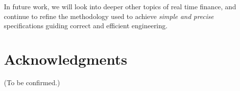 In future work, we will look into deeper other topics of real time finance, and continue to refine
the methodology used to achieve \textit{simple and precise} specifications guiding correct and
efficient engineering.

\part*{Acknowledgments}

(To be confirmed.)

\newpage
\printbibliography{}


